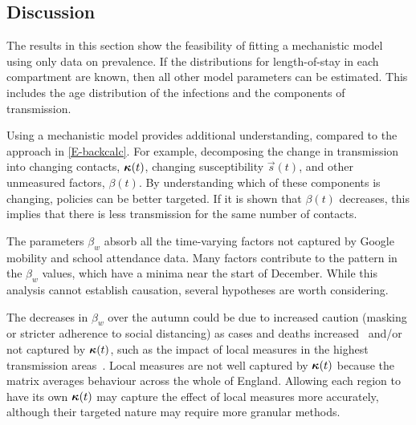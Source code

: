 \documentclass[thesis.tex]{subfiles}
\begin{document}
\subsection{Discussion} \label{SEIR:sec:discussion}

The results in this section show the feasibility of fitting a mechanistic model using only data on prevalence.
If the distributions for length-of-stay in each compartment are known, then all other model parameters can  be estimated.
This includes the age distribution of the infections and the components of transmission.

Using a mechanistic model provides additional understanding, compared to the approach in \cref{E-backcalc}.
For example, decomposing the change in transmission into changing contacts, $\bm{\kappa}(t)$, changing susceptibility $\vec{s}(t)$, and other unmeasured factors, $\beta(t)$.
By understanding which of these components is changing, policies can be better targeted.
If it is shown that $\beta(t)$ decreases, this implies that there is less transmission for the same number of contacts.


The parameters $\beta_w$ absorb all the time-varying factors not captured by Google mobility and school attendance data.
Many factors contribute to the pattern in the $\beta_w$ values, which have a minima near the start of December.
While this analysis cannot establish causation, several hypotheses are worth considering.

The decreases in $\beta_w$ over the autumn could be due to increased caution (\eg masking or stricter adherence to social distancing) as cases and deaths increased~\autocite{jarvisEffect} and/or not captured by $\bm{\kappa}(t)$, such as the impact of local measures in the highest transmission areas~\autocite{scottCovid19}.
Local measures are not well captured by $\bm{\kappa}(t)$ because the matrix averages behaviour across the whole of England.
Allowing each region to have its own $\bm{\kappa}(t)$ may capture the effect of local measures more accurately, although their targeted nature may require more granular methods.
\end{document}
